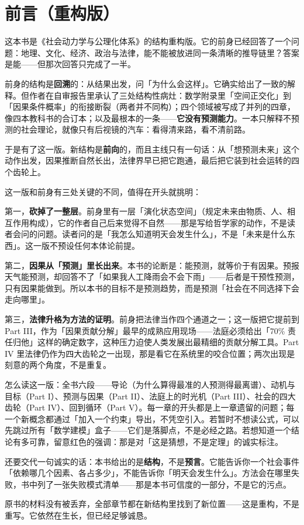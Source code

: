 \chapter*{前言（重构版）}

这本书是《社会动力学与公理化体系》的结构重构版。它的前身已经回答了一个问题：地理、文化、经济、政治与法律，能不能被放进同一条清晰的推导链里？答案是能——但那次回答只完成了一半。

前身的结构是\textbf{回溯}的：从结果出发，问「为什么会这样」。它确实给出了一致的解释。但作者在自审报告里承认了三处结构性病灶：数学附录里「空间正交化」到「因果条件概率」的衔接断裂（两者并不同构）；四个领域被写成了并列的四章，像四本教科书的合订本；以及最根本的一条——\textbf{它没有预测能力}。一本只解释不预测的社会理论，就像只有后视镜的汽车：看得清来路，看不清前路。

于是有了这一版。新结构是\textbf{前向}的，而且主线只有一句话：从「想预测未来」这个动作出发，因果推断自然长出，法律界早已把它跑通，最后把它装到社会运转的四个齿轮上。

这一版和前身有三处关键的不同，值得在开头就挑明：

第一，\textbf{砍掉了一整层}。前身里有一层「演化状态空间」（规定未来由物质、人、相互作用构成），它的作者自己后来觉得不自然——那是写给哲学家的动作，不是读者会问的问题。读者问的是「我怎么知道明天会发生什么」，不是「未来是什么东西」。这一版不预设任何本体论前提。

第二，\textbf{因果从「预测」里长出来}。本书的论断是：能预测，就等价于有因果。预报天气能预测，却回答不了「如果我人工降雨会不会下雨」——后者是干预性预测，只有因果能做到。所以本书的目标不是预测趋势，而是预测「社会在不同选择下会走向哪里」。

第三，\textbf{法律升格为方法的证明}。前身把法律当作四个通道之一；这一版把它提前到 Part III，作为「因果贡献分解」最早的成熟应用现场——法庭必须给出「70\% 责任归他」这样的确定数字，这种压力迫使人类发展出最精细的贡献分解工具。Part IV 里法律仍作为四大齿轮之一出现，那是看它在系统里的咬合位置；两次出现是刻意的两个角度，不是重复。

怎么读这一版：全书六段——导论（为什么算得最准的人预测得最离谱）、动机与目标（Part I）、预测与因果（Part II）、法庭上的时光机（Part III）、社会的四大齿轮（Part IV）、回到循环（Part V）。每一章的开头都是上一章遗留的问题；每一个新概念都通过「加入一个约束」导出，不凭空引入。若暂时不想读公式，可以先跳过所有「数学建模」盒子——它们是落脚点，不是必经之路。若想知道一个结论有多可靠，留意红色的强调：那是对「这是猜想，不是定理」的诚实标注。

还要交代一句诚实的话：本书给出的是\textbf{结构}，不是\textbf{预言}。它能告诉你一个社会事件「依赖哪几个因素、各占多少」，不能告诉你「明天会发生什么」。方法会在哪里失败，书中列了一张失败模式清单——那是本书可信度的一部分，不是它的污点。

原书的材料没有被丢弃，全部章节都在新结构里找到了新位置——这是重构，不是重写。它依然在生长，但已经足够诚恳。
